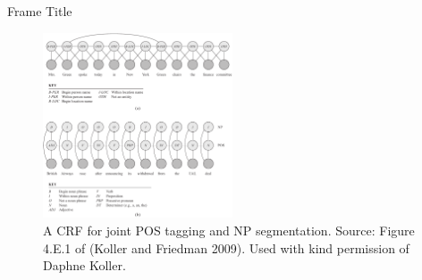 \documentclass[10pt,mathserif]{beamer}
\begin{document}
\begin{frame}{Frame Title}
\begin{figure}[h]
\centering
\includegraphics[width=0.5\textwidth]{crfBIO}
\caption{A CRF for joint POS tagging and NP segmentation. Source: Figure 4.E.1 of (Koller and Friedman 2009). Used with kind permission of Daphne Koller.}
\end{figure}    
\end{frame}
\end{document}

